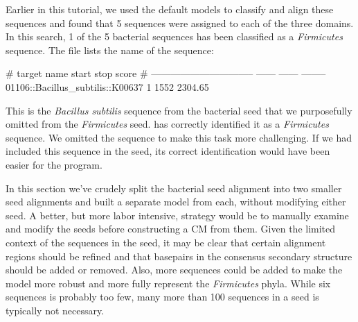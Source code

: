 Earlier in this tutorial, we used the default models to classify and
align these sequences and found that 5 sequences were assigned to each of the
three domains. In this search, 1 of the 5 bacterial sequences has been
classified as a \emph{Firmicutes} sequence. The
 file lists the name of the
sequence:

\begin{sreoutput}
# target name                        start    stop     score
# --------------------------------  ------  ------  --------
  01106::Bacillus_subtilis::K00637       1    1552   2304.65
\end{sreoutput}

This is the \emph{Bacillus subtilis} sequence from the bacterial seed
that we purposefully omitted from the \emph{Firmicutes}
seed.  has correctly identified it as a
\emph{Firmicutes} sequence. 
We omitted the sequence to make this task more challenging.
If we had included this sequence in the seed, its correct
identification would have been easier for the program.

In this section we've crudely split the bacterial seed alignment
into two smaller seed alignments and built a separate model from each,
without modifying either seed. A better, but more labor intensive,
strategy would be to manually examine and modify the seeds before constructing a
CM from them. Given the limited context of the sequences in the seed,
it may be clear that certain alignment regions should be refined and
that basepairs in the consensus secondary structure should be added or
removed. Also, more sequences could be added to make the model more
robust and more fully represent the \emph{Firmicutes} phyla. While six
sequences is probably too few, many more than 100 sequences in a seed
is typically not necessary.



